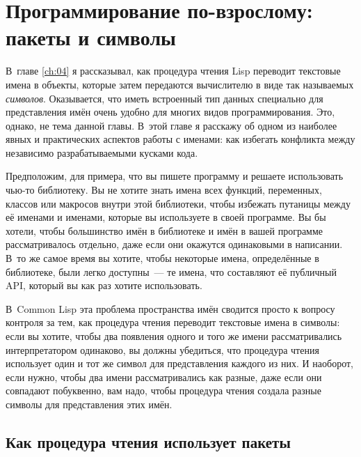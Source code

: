 \chapter{Программирование по-взрослому: пакеты и символы}
\label{ch:21}

\thispagestyle{empty}

В~главе \ref{ch:04} я рассказывал, как процедура чтения Lisp переводит текстовые имена в
объекты, которые затем передаются вычислителю в виде так называемых \textit{символов}.
Оказывается, что иметь встроенный тип данных специально для представления имён очень
удобно для многих видов программирования. Это, однако, не тема
данной главы. В~этой главе я расскажу об одном из наиболее явных и практических аспектов
работы с именами: как избегать конфликта между независимо разрабатываемыми кусками кода.

Предположим, для примера, что вы пишете программу и решаете использовать чью-то
библиотеку.  Вы не хотите знать имена всех функций, переменных, классов или макросов
внутри этой библиотеки, чтобы избежать путаницы между её именами и именами, которые вы
используете в своей программе. Вы бы хотели, чтобы большинство имён в библиотеке и имён в
вашей программе рассматривалось отдельно, даже если они окажутся одинаковыми в написании.
В~то же самое время вы хотите, чтобы некоторые имена, определённые в библиотеке, были
легко доступны~--- те имена, что составляют её публичный API, который вы как раз хотите
использовать.

В~Common Lisp эта проблема пространства имён сводится просто к вопросу конт\-ро\-ля за тем,
как процедура чтения переводит текстовые имена в символы: если вы хотите, чтобы два появления
одного и того же имени рассматривались интерпретатором одинаково, вы должны убедиться, что
процедура чтения использует один и тот же символ для представления каждого из них. И наоборот,
если нужно, чтобы два имени рассматривались как разные, даже если они совпадают
побуквенно, вам надо, чтобы процедура чтения создала разные символы для представления этих имён.

\section{Как процедура чтения использует пакеты}

